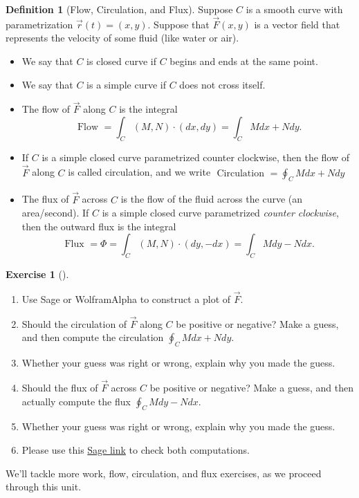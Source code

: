 \documentclass[10pt,]{book}
\theoremstyle{plain}
\theoremstyle{definition}
\newtheorem{definition}[theorem]{Definition}
\theoremstyle{definition}
\theoremstyle{definition}
\theoremstyle{definition}
\newtheorem{exploration}[project]{Exercise}
\theoremstyle{definition}
\numberwithin{equation}{section}
\newcommand{\sageworkfluxurl}{http://bmw.byuimath.com/dokuwiki/doku.php?id=both_flux_and_work}
\begin{document}
\begin{definition}[{Flow, Circulation, and Flux}]\label{definition-33}
Suppose \(C\) is a smooth curve with parametrization \(\vec r(t)=(x,y)\). Suppose that \(\vec F(x,y)\) is a vector field that represents the velocity of some fluid (like water or air). \leavevmode%
\begin{itemize}[label=\textbullet]
\item{}We say that \(C\) is closed curve if \(C\) begins and ends at the same point.%
\item{}We say that \(C\) is a simple curve if \(C\) does not cross itself.%
\item{}The flow of \(\vec F\) along \(C\) is the integral%
\begin{equation*}
\text{ Flow }  = \int_C (M,N)\cdot (dx,dy) = \int_C Mdx+Ndy.
\end{equation*}
%
\item{}If \(C\) is a simple closed curve parametrized counter clockwise, then the flow of \(\vec F\) along \(C\) is called circulation, and we write \(\text{ Circulation }  = \oint_C Mdx+Ndy\)%
\item{}The flux of \(\vec F\) across \(C\) is the flow of the fluid across the curve (an area/second). If \(C\) is a simple closed curve parametrized \emph{counter clockwise}, then the outward flux is the integral%
\begin{equation*}
\text{ Flux }  = \Phi = \int_C(M,N)\cdot (dy,-dx) =\int_C Mdy-Ndx .
\end{equation*}
%
\end{itemize}
%
\end{definition}
\begin{exploration}[]\label{exploration-195}
\leavevmode%
\begin{enumerate}[font=\bfseries,label=(\alph*),ref=\alph*]
\item\label{task-494} Use Sage or WolframAlpha to construct a plot of \(\vec F\).%
\item\label{task-495} Should the circulation of \(\vec F\) along \(C\) be positive or negative?  Make a guess, and then compute the circulation \(\oint_C Mdx+Ndy\).%
\item\label{task-496} Whether your guess was right or wrong, explain why you made the guess.%
\item\label{task-497} Should the flux of \(\vec F\) across \(C\) be positive or negative? Make a guess, and then actually compute the flux \(\oint_C Mdy-Ndx\).%
\item\label{task-498} Whether your guess was right or wrong, explain why you made the guess.%
\item\label{task-499} Please use this \href{\\sageworkfluxurl}{Sage link} to check both computations.%
\end{enumerate}
\end{exploration}
We'll tackle more work, flow, circulation, and flux exercises, as we proceed through this unit.%
\typeout{************************************************}
\typeout{************************************************}
\end{document}
